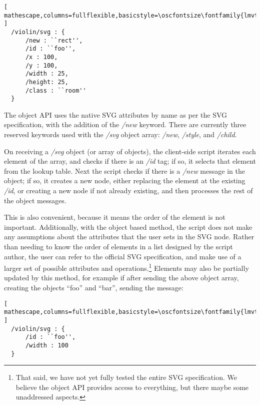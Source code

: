 \begin{minipage}{\linewidth}
\begin{lstlisting}[ mathescape,columns=fullflexible,basicstyle=\oscfontsize\fontfamily{lmvtt}\selectfont ]
  /violin/svg : {
      /new : ``rect'',
      /id : ``foo'',
      /x : 100,
      /y : 100,
      /width : 25,
      /height: 25,
      /class : ``room''
  }
\end{lstlisting}
\end{minipage}

The \drawsocket object API uses the native SVG attributes by name as per the SVG specification, with the addition of the \textit{/new} keyword.
There are currently three reserved keywords used with the \textit{/svg} object array: \textit{/new}, \textit{/style}, and \textit{/child}.

On receiving a \textit{/svg} object (or array of objects), the client-side script iterates each element of the array, and checks if there is an \textit{/id} tag; if so, it selects that element from the lookup table.
Next the script checks if there is a \textit{/new} message in the object; if so, it creates a new node, either replacing the element at the existing \textit{/id}, or creating a new node if not already existing, and then processes the rest of the object messages.

This is also convenient, because it means the order of the element is not important.
Additionally, with the object based method, the script does not make any assumptions about the attributes that the user sets in the SVG node.
Rather than needing to know the order of elements in a list designed by the script author, the user can refer to the official SVG specification, and make use of a larger set of possible attributes and operations.\footnote{That said, we have not yet fully tested the entire SVG specification. We believe the object API provides access to everything, but there maybe some unaddressed aspects.} 
Elements may also be partially updated by this method, for example if after sending the above object array, creating the objects ``foo'' and ``bar'', sending the message:

\begin{minipage}{\linewidth}
\begin{lstlisting}[ mathescape,columns=fullflexible,basicstyle=\oscfontsize\fontfamily{lmvtt}\selectfont ]
  /violin/svg : {
      /id : ``foo'',
      /width : 100
  }
  \end{lstlisting}
\end{minipage}

